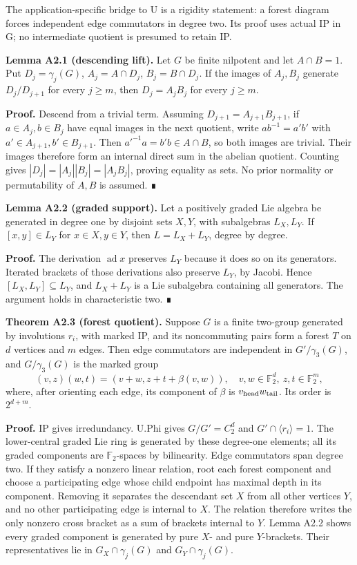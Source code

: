 \documentclass[
  11pt,
  a4paper,
]{article}
\begin{document}
The application-specific bridge to U is a rigidity statement: a forest
diagram forces independent edge commutators in degree two. Its proof
uses actual IP in G; no intermediate quotient is presumed to retain IP.

\textbf{Lemma A2.1 (descending lift).} Let \(G\) be finite nilpotent and
let \(A\cap B=1\). Put \(D_j=\gamma_j(G)\), \(A_j=A\cap D_j\),
\(B_j=B\cap D_j\). If the images of \(A_j,B_j\) generate \(D_j/D_{j+1}\)
for every \(j\ge m\), then \(D_j=A_jB_j\) for every \(j\ge m\).

\textbf{Proof.} Descend from a trivial term. Assuming
\(D_{j+1}=A_{j+1}B_{j+1}\), if \(a\in A_j,b\in B_j\) have equal images
in the next quotient, write \(ab^{-1}=a'b'\) with
\(a'\in A_{j+1},b'\in B_{j+1}\). Then \(a'^{-1}a=b'b\in A\cap B\), so
both images are trivial. Their images therefore form an internal direct
sum in the abelian quotient. Counting gives
\(|D_j|=|A_j||B_j|=|A_jB_j|\), proving equality as sets. No prior
normality or permutability of \(A,B\) is assumed. ∎

\textbf{Lemma A2.2 (graded support).} Let a positively graded Lie
algebra be generated in degree one by disjoint sets \(X,Y\), with
subalgebras \(L_X,L_Y\). If \([x,y]\in L_Y\) for \(x\in X,y\in Y\), then
\(L=L_X+L_Y\), degree by degree.

\textbf{Proof.} The derivation \(\operatorname{ad}x\) preserves \(L_Y\)
because it does so on its generators. Iterated brackets of those
derivations also preserve \(L_Y\), by Jacobi. Hence
\([L_X,L_Y]\subseteq L_Y\), and \(L_X+L_Y\) is a Lie subalgebra
containing all generators. The argument holds in characteristic two. ∎

\textbf{Theorem A2.3 (forest quotient).} Suppose \(G\) is a finite
two-group generated by involutions \(r_i\), with marked IP, and its
noncommuting pairs form a forest \(T\) on \(d\) vertices and \(m\)
edges. Then edge commutators are independent in \(G'/\gamma_3(G)\), and
\(G/\gamma_3(G)\) is the marked group \[
 (v,z)(w,t)=(v+w,z+t+\beta(v,w)),\quad
 v,w\in\mathbb F_2^d,\ z,t\in\mathbb F_2^m,               \tag{A-F}
\] where, after orienting each edge, its component of \(\beta\) is
\(v_{\rm head}w_{\rm tail}\). Its order is \(2^{d+m}\).

\textbf{Proof.} IP gives irredundancy. U.Phi gives \(G/G'=C_2^d\) and
\(G'\cap\langle r_i\rangle=1\). The lower-central graded Lie ring is
generated by these degree-one elements; all its graded components are
\(\mathbb F_2\)-spaces by bilinearity. Edge commutators span degree two.
If they satisfy a nonzero linear relation, root each forest component
and choose a participating edge whose child endpoint has maximal depth
in its component. Removing it separates the descendant set \(X\) from
all other vertices \(Y\), and no other participating edge is internal to
\(X\). The relation therefore writes the only nonzero cross bracket as a
sum of brackets internal to \(Y\). Lemma A2.2 shows every graded
component is generated by pure \(X\)- and pure \(Y\)-brackets. Their
representatives lie in \(G_X\cap\gamma_j(G)\) and
\(G_Y\cap\gamma_j(G)\).
\end{document}
